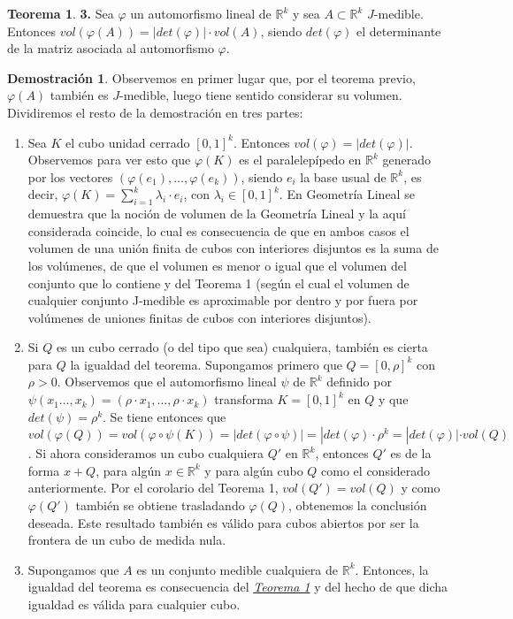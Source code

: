 \documentclass[12pt,twoside]{report}
\theoremstyle{azul}
\theoremstyle{azul2}
\theoremstyle{plain}
\theoremstyle{definition}
\newtheorem*{dem}{Demostración}
\newtheorem*{theo}{Teorema}
\theoremstyle{remark}
\begin{document}
\begin{theo} \textbf{3.} \label{teo3}
Sea $\varphi$ un automorfismo lineal de $\mathbb{R}^k$ y sea $A\subset \mathbb{R} ^k $ $J$-medible. Entonces $vol(\varphi(A))= |det(\varphi)| \cdot vol (A)$, siendo $det(\varphi)$ el determinante de la matriz asociada al automorfismo $\varphi$.
\end{theo}
\begin{dem}
Observemos en primer lugar que, por el teorema previo, $\varphi(A)$ también es $J$-medible, luego tiene sentido considerar su volumen. Dividiremos el resto de la demostración en tres partes:
\begin{enumerate}
    \item Sea $K$ el cubo unidad cerrado $[0,1]^k$. Entonces $vol(\varphi)=|det(\varphi)|$. Observemos para ver esto que $\varphi(K)$ es el paralelepípedo en $\mathbb{R}^k$ generado por los vectores $(\varphi(e_1), \ldots, \varphi(e_k))$, siendo ${e_i}$ la base usual de $\mathbb{R}^k$, es decir, $\varphi(K)= \sum_{i=1}^k \lambda_i \cdot e_i$, con $\lambda_i \in [0,1]^k $. En Geometría Lineal se demuestra que la noción de volumen de la Geometría Lineal y la aquí considerada coincide, lo cual es consecuencia de que en ambos casos el volumen de una unión finita de cubos con interiores disjuntos es la suma de los volúmenes, de que el volumen es menor o igual que el volumen del conjunto que lo contiene y del Teorema 1 (según el cual el volumen de cualquier conjunto J-medible es aproximable por dentro y por fuera por volúmenes de uniones finitas de cubos con interiores disjuntos).
    \item Si $Q$ es un cubo cerrado (o del tipo que sea) cualquiera, también es cierta para $Q$ la igualdad del teorema. Supongamos primero que $Q=[0, \rho]^k$ con $\rho >0$. Observemos que el automorfismo lineal $\psi$ de $\mathbb{R}^k$ definido por $\psi(x_1\ldots, x_k)= (\rho\cdot x_1, \ldots, \rho\cdot x_k)$ transforma $K=[0,1]^k$ en $Q$ y que $det(\psi)=\rho^k$. Se tiene entonces que $vol(\varphi(Q))=vol(\varphi \circ \psi(K))=|det(\varphi \circ \psi)|= |det(\varphi) \cdot \rho^k=|det(\varphi)|\cdot vol(Q)$. Si ahora consideramos un cubo cualquiera $Q'$ en $\mathbb{R}^k$, entonces $Q'$ es de la forma $x+Q$, para algún $x\in \mathbb{R}^k$ y para algún cubo $Q$ como el considerado anteriormente. Por el corolario del Teorema 1, $vol(Q')=vol(Q)$ y como $\varphi(Q')$ también se obtiene trasladando $\varphi(Q)$, obtenemos la conclusión deseada. Este resultado también es válido para cubos abiertos por ser la frontera de un cubo de medida nula.
    \item Supongamos que $A$ es un conjunto medible cualquiera de $\mathbb{R}^k$. Entonces, la igualdad del teorema es consecuencia del \hyperref[teo1]{\textit{Teorema 1}} y del hecho de que dicha igualdad es válida para cualquier cubo.
    
    \end{enumerate}
\end{dem}
\end{document}
